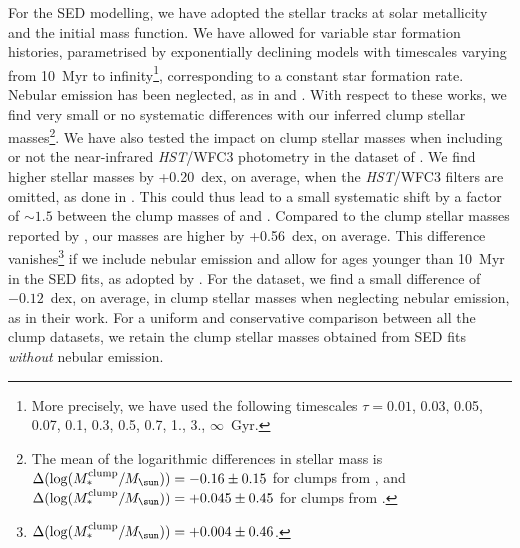 \documentclass[twocolumn]{aastex61}
\begin{document}
For the SED modelling, we have adopted the \citet{bruzual03} stellar tracks at 
solar metallicity and the \citet{chabrier03} initial mass function. We have 
allowed for variable star formation histories, parametrised by exponentially 
declining models with timescales varying from 10~Myr to infinity\footnote{More 
precisely, we have used the following timescales $\tau=0.01$, 0.03, 0.05, 0.07, 
0.1, 0.3, 0.5, 0.7, 1., 3., $\infty$~Gyr.}, corresponding to a constant star 
formation rate. Nebular emission has been neglected, as in \citet{guo12} and 
\citet{elmegreen13}. With respect to these works, we find very small or no 
systematic differences with our inferred clump stellar masses\footnote{The mean 
of the logarithmic differences in stellar mass is 
$\Delta(\log(M^{\rm clump}_*/M_{\sun})) = -0.16\pm 0.15$ for clumps from 
\citet{guo12}, and $\Delta(\log(M^{\rm clump}_*/M_{\sun})) = +0.045\pm 0.45$ for 
clumps from \citet{elmegreen13}.}. We have also tested the impact on clump 
stellar masses when including or not the near-infrared {\it HST}/WFC3 photometry 
in the dataset of \citet{guo12}. We find higher stellar masses by +0.20~dex, on 
average, when the {\it HST}/WFC3 filters are omitted, as done in 
\citet{elmegreen13}. This could thus lead to a small systematic shift by a 
factor of $\sim 1.5$ between the clump masses of \citet{guo12} and 
\citet{elmegreen13}.
Compared to the clump stellar masses reported by \citet{adamo13}, our masses are 
higher by +0.56~dex, on average. This difference 
vanishes\footnote{$\Delta(\log(M^{\rm clump}_*/M_{\sun})) = +0.004\pm 0.46$.} if 
we include nebular emission and allow for ages younger than 10~Myr in the SED 
fits, as adopted by \citet{adamo13}. For the \citet{wuyts14} dataset, we find a 
small difference of $-0.12$~dex, on average, in clump stellar masses when 
neglecting nebular emission, as in their work. For a uniform and conservative 
comparison between all the clump datasets, we retain the clump stellar masses 
obtained from SED fits {\it without} nebular emission.

\end{document}
